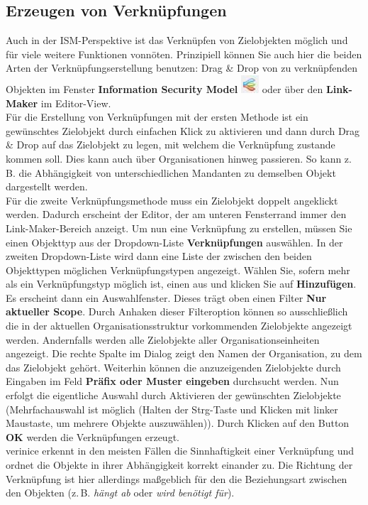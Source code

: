 \documentclass[a4paper,10pt]{book}
\begin{document}
\subsection{Erzeugen von Verknüpfungen}
\label{sec:ismView_dd}
Auch in der ISM-Perspektive ist das Verknüpfen von Zielobjekten
möglich und für viele weitere Funktionen vonnöten.  Prinzipiell können
Sie auch hier die beiden Arten der Verknüpfungserstellung benutzen:
Drag \& Drop von zu verknüpfenden Objekten im Fenster
\textbf{Information Security
  Model} \includegraphics[height=2ex]{Icon/Informationssicherheitsmodell.png}
oder über den \textbf{Link-Maker} im Editor-View.
\newline\\
Für die Erstellung von Verknüpfungen mit der ersten Methode ist ein
gewünschtes Zielobjekt durch einfachen Klick zu aktivieren und dann
durch Drag \& Drop auf das Zielobjekt zu legen, mit welchem die
Verknüpfung zustande kommen soll. Dies kann auch über Organisationen
hinweg passieren.  So kann z.\,B. die Abhängigkeit von
unterschiedlichen Mandanten zu demselben Objekt dargestellt werden.
\newline\\
Für die zweite Verknüpfungsmethode muss ein Zielobjekt doppelt
angeklickt werden.  Dadurch erscheint der Editor, der am unteren
Fensterrand immer den Link-Maker-Bereich anzeigt.  Um nun eine
Verknüpfung zu erstellen, müssen Sie einen Objekttyp aus der
Dropdown-Liste \textbf{Verknüpfungen} auswählen.  In der zweiten
Dropdown-Liste wird dann eine Liste der zwischen den beiden
Objekttypen möglichen Verknüpfungstypen angezeigt.  Wählen Sie, sofern
mehr als ein Verknüpfungstyp möglich ist, einen aus und klicken Sie
auf \textbf{Hinzufügen}.  Es erscheint dann ein Auswahlfenster.
Dieses trägt oben einen Filter \textbf{Nur aktueller Scope}.  Durch
Anhaken dieser Filteroption können so ausschließlich die in der
aktuellen Organisationsstruktur vorkommenden Zielobjekte angezeigt
werden.  Andernfalls werden alle Zielobjekte aller
Organisationseinheiten angezeigt.  Die rechte Spalte im Dialog zeigt
den Namen der Organisation, zu dem das Zielobjekt gehört.  Weiterhin
können die anzuzeigenden Zielobjekte durch Eingaben im Feld
\textbf{Präfix oder Muster eingeben} durchsucht werden.  Nun erfolgt
die eigentliche Auswahl durch Aktivieren der gewünschten Zielobjekte
(Mehrfachauswahl ist möglich (Halten der Strg-Taste und Klicken mit
linker Maustaste, um mehrere Objekte auszuwählen)).  Durch Klicken auf
den Button \textbf{OK} werden die Verknüpfungen erzeugt.
\newline\\
verinice erkennt in den meisten Fällen die Sinnhaftigkeit einer
Verknüpfung und ordnet die Objekte in ihrer Abhängigkeit korrekt
einander zu.  Die Richtung der Verknüpfung ist hier allerdings
maßgeblich für den die Beziehungsart zwischen den Objekten
(z.\,B. {\em hängt ab} oder {\em wird benötigt für}).
\end{document}
